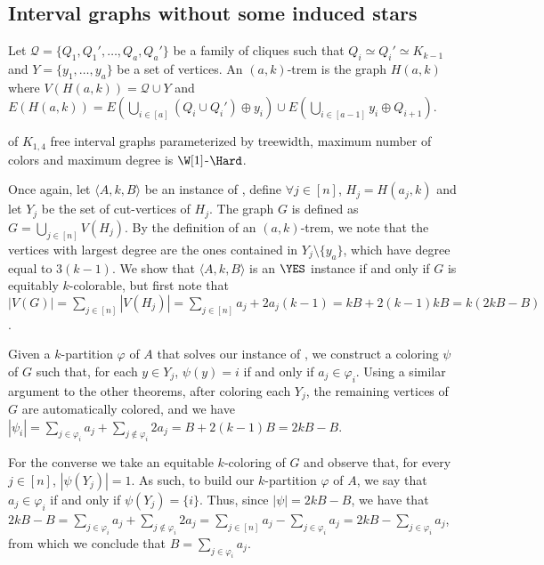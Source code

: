 \subsection{Interval graphs without some induced stars}


\begin{definition}
    Let $\mathcal{Q} = \{Q_1, Q_1', \dots, Q_a, Q_a'\}$ be a family of cliques such that $Q_i \simeq Q_i' \simeq K_{k-1}$ and $Y = \{y_1, \dots, y_a\}$ be a set of vertices.
    An $(a,k)$-trem is the graph $H(a,k)$ where $V\left(H(a,k)\right) = \mathcal{Q} \cup Y$ and $E\left(H(a,k)\right) = E\left(\bigcup_{i \in [a]} (Q_i \cup Q_i') \oplus y_i\right) \cup E\left(\bigcup_{i \in [a-1]} y_i \oplus Q_{i+1}\right)$.
\end{definition}

\begin{theorem}
    \label{thm:chordal_w1_hard}
     of $K_{1,4}$ free interval graphs parameterized by treewidth, maximum number of colors and maximum degree is $\W[1]$-$\Hard$.
\end{theorem}

\begin{tproof}
    Once again, let $\langle A,k,B\rangle$ be an instance of , define $\forall j \in [n]$, $H_j = H(a_j, k)$ and let $Y_j$ be the set of cut-vertices of $H_j$.
    The graph $G$ is defined as $G = \bigcup_{j \in [n]} V(H_j)$.
    By the definition of an $(a,k)$-trem, we note that the vertices with largest degree are the ones contained in $Y_j \setminus \{y_a\}$, which have degree equal to $3(k-1)$.
    We show that $\langle A,k,B\rangle$ is an $\YES$ instance if and only if $G$ is equitably $k$-colorable, but first note that $|V(G)| = \sum_{j \in [n]} |V(H_j)| = \sum_{j \in [n]} a_j + 2a_j(k-1) = kB + 2(k-1)kB = k(2kB - B)$.
    
    Given a $k$-partition $\varphi$ of $A$ that solves our instance of , we construct a coloring $\psi$ of $G$ such that, for each $y \in Y_j$, $\psi(y) = i$ if and only if $a_j \in \varphi_i$.
    Using a similar argument to the other theorems, after coloring each $Y_j$, the remaining vertices of $G$ are automatically colored, and we have  $|\psi_i| = \sum_{j \in \varphi_i} a_j + \sum_{j \notin \varphi_i} 2a_j = B + 2(k-1)B = 2kB - B$.
    
    For the converse we take an equitable $k$-coloring of $G$ and observe that, for every $j \in [n]$, $|\psi(Y_j)| = 1$.
    As such, to build our $k$-partition $\varphi$ of $A$, we say that $a_j \in \varphi_i$ if and only if $\psi(Y_j) = \{i\}$.
    Thus, since $|\psi| = 2kB - B$, we have that $2kB - B = \sum_{j \in \varphi_i} a_j + \sum_{j \notin \varphi_i} 2a_j = \sum_{j \in [n]} a_j - \sum_{j \in \varphi_i} a_j = 2kB - \sum_{j \in \varphi_i} a_j$, from which we conclude that $B = \sum_{j \in \varphi_i} a_j$.
\end{tproof}